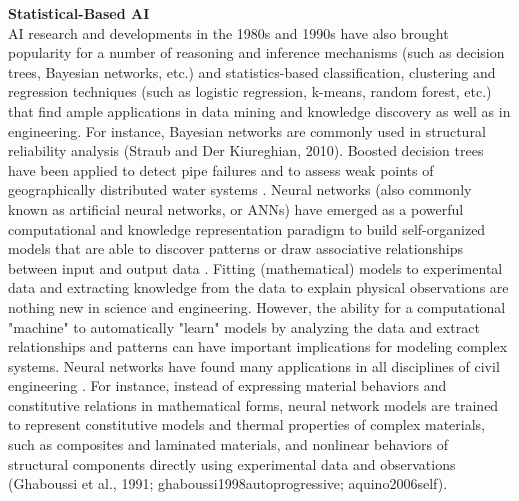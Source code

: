 \noindent\textbf{Statistical-Based AI} \\AI research and developments in the 1980s and 1990s have also brought popularity for a number of reasoning and inference mechanisms (such as decision trees, Bayesian networks, etc.) and statistics-based classification, clustering and regression techniques (such as logistic regression, k-means, random forest, etc.) that find ample applications in data mining and knowledge discovery as well as in engineering. For instance, Bayesian networks are commonly used in structural reliability analysis (Straub and Der Kiureghian, 2010). Boosted decision trees have been applied to detect pipe failures and to assess weak points of geographically distributed water systems \citep{winkler2018pipe,kumar2018using}. Neural networks (also commonly known as artificial neural networks, or ANNs) have emerged as a powerful computational and knowledge representation paradigm to build self-organized models that are able to discover patterns or draw associative relationships between input and output data \citep{bishop1995neural}. Fitting (mathematical) models to experimental data and extracting knowledge from the data to explain physical observations are nothing new in science and engineering. However, the ability for a computational "machine" to automatically "learn" models by analyzing the data and extract relationships and patterns can have important implications for modeling complex systems. Neural networks have found many applications in all disciplines of civil engineering \citep{garrettjr1996ai,kartam1997artificial}. For instance, instead of expressing material behaviors and constitutive relations in mathematical forms, neural network models are trained to represent constitutive models and thermal properties of complex materials, such as composites and laminated materials, and nonlinear behaviors of structural components directly using experimental data and observations (Ghaboussi et al., 1991; ghaboussi1998autoprogressive; aquino2006self). 
\newline
 
